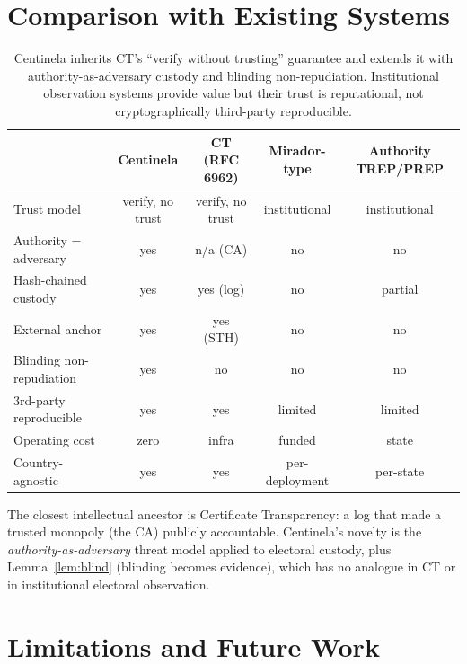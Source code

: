 \documentclass[11pt,a4paper]{article}
\theoremstyle{plain}
\theoremstyle{definition}
\theoremstyle{remark}
\begin{document}
\section{Comparison with Existing Systems}
\label{sec:comparison}

\begin{table}[h]
\centering
\small
\begin{tabular}{@{}lcccc@{}}
\toprule
 & \textbf{Centinela} & \textbf{CT (RFC 6962)} & \textbf{Mirador-type} & \textbf{Authority TREP/PREP} \\
\midrule
Trust model            & verify, no trust & verify, no trust & institutional & institutional \\
Authority = adversary  & yes & n/a (CA) & no & no \\
Hash-chained custody   & yes & yes (log) & no & partial \\
External anchor        & yes & yes (STH) & no & no \\
Blinding non-repudiation & yes & no & no & no \\
3rd-party reproducible & yes & yes & limited & limited \\
Operating cost         & zero & infra & funded & state \\
Country-agnostic       & yes & yes & per-deployment & per-state \\
\bottomrule
\end{tabular}
\caption{Centinela inherits CT's ``verify without trusting'' guarantee
and extends it with authority-as-adversary custody and blinding
non-repudiation. Institutional observation systems provide value but
their trust is reputational, not cryptographically third-party
reproducible.}
\end{table}

The closest intellectual ancestor is Certificate Transparency: a log
that made a trusted monopoly (the CA) publicly accountable. Centinela's
novelty is the \emph{authority-as-adversary} threat model applied to
electoral custody, plus Lemma~\ref{lem:blind} (blinding becomes
evidence), which has no analogue in CT or in institutional electoral
observation.

\section{Limitations and Future Work}
\label{sec:limits}
\end{document}
